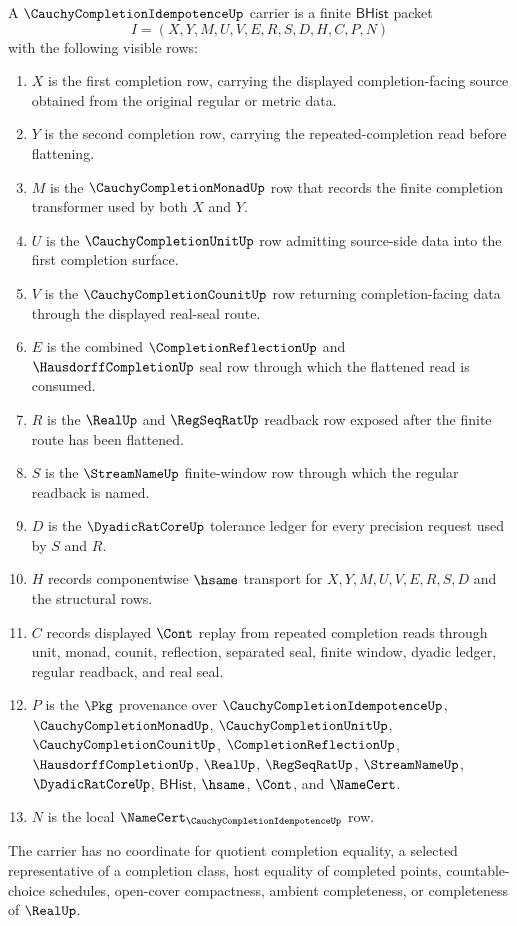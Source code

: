 \begin{definition}
\label{def:cauchy-completion-idempotence-carrier}
A $\CauchyCompletionIdempotenceUp$ carrier is a finite $\mathsf{BHist}$ packet
$$
I=(X,Y,M,U,V,E,R,S,D,H,C,P,N)
$$
with the following visible rows:
\begin{enumerate}
\item $X$ is the first completion row, carrying the displayed completion-facing source obtained from the original regular or metric data.
\item $Y$ is the second completion row, carrying the repeated-completion read before flattening.
\item $M$ is the $\CauchyCompletionMonadUp$ row that records the finite completion transformer used by both $X$ and $Y$.
\item $U$ is the $\CauchyCompletionUnitUp$ row admitting source-side data into the first completion surface.
\item $V$ is the $\CauchyCompletionCounitUp$ row returning completion-facing data through the displayed real-seal route.
\item $E$ is the combined $\CompletionReflectionUp$ and $\HausdorffCompletionUp$ seal row through which the flattened read is consumed.
\item $R$ is the $\RealUp$ and $\RegSeqRatUp$ readback row exposed after the finite route has been flattened.
\item $S$ is the $\StreamNameUp$ finite-window row through which the regular readback is named.
\item $D$ is the $\DyadicRatCoreUp$ tolerance ledger for every precision request used by $S$ and $R$.
\item $H$ records componentwise $\hsame$ transport for $X,Y,M,U,V,E,R,S,D$ and the structural rows.
\item $C$ records displayed $\Cont$ replay from repeated completion reads through unit, monad, counit, reflection, separated seal, finite window, dyadic ledger, regular readback, and real seal.
\item $P$ is the $\Pkg$ provenance over $\CauchyCompletionIdempotenceUp$, $\CauchyCompletionMonadUp$, $\CauchyCompletionUnitUp$, $\CauchyCompletionCounitUp$, $\CompletionReflectionUp$, $\HausdorffCompletionUp$, $\RealUp$, $\RegSeqRatUp$, $\StreamNameUp$, $\DyadicRatCoreUp$, $\mathsf{BHist}$, $\hsame$, $\Cont$, and $\NameCert$.
\item $N$ is the local $\NameCert_{\CauchyCompletionIdempotenceUp}$ row.
\end{enumerate}
The carrier has no coordinate for quotient completion equality, a selected representative of a completion class, host equality of completed points, countable-choice schedules, open-cover compactness, ambient completeness, or completeness of $\RealUp$.
\end{definition}


